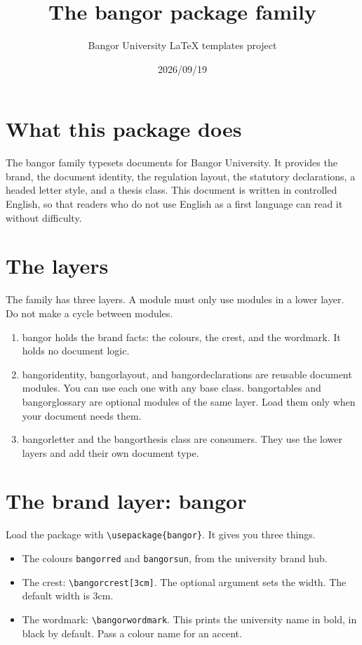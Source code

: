 \documentclass[a4paper,12pt]{article}
\title{The bangor package family}
\author{Bangor University LaTeX templates project}
\date{2026/09/19}
\begin{document}
\maketitle

\section{What this package does}
The \textsf{bangor} family typesets documents for Bangor University.
It provides the brand, the document identity, the regulation layout,
the statutory declarations, a headed letter style, and a thesis class.
This document is written in controlled English, so that readers who
do not use English as a first language can read it without difficulty.

\section{The layers}
The family has three layers. A module must only use modules in a lower
layer. Do not make a cycle between modules.

\begin{enumerate}
  \item \textsf{bangor} holds the brand facts: the colours, the crest,
        and the wordmark. It holds no document logic.
  \item \textsf{bangoridentity}, \textsf{bangorlayout}, and
        \textsf{bangordeclarations} are reusable document modules. You can use
        each one with any base class. \textsf{bangortables} and
        \textsf{bangorglossary} are optional modules of the same layer. Load
        them only when your document needs them.
  \item \textsf{bangorletter} and the \textsf{bangorthesis} class are
        consumers. They use the lower layers and add their own document type.
\end{enumerate}

\section{The brand layer: bangor}
Load the package with \verb|\usepackage{bangor}|. It gives you three
things.

\begin{itemize}
  \item The colours \verb|bangorred| and \verb|bangorsun|, from the
        university brand hub.
  \item The crest: \verb|\bangorcrest[3cm]|. The optional argument sets
        the width. The default width is 3cm.
  \item The wordmark: \verb|\bangorwordmark|. This prints the university
        name in bold, in black by default. Pass a colour name for an accent.
\end{itemize}
\end{document}
